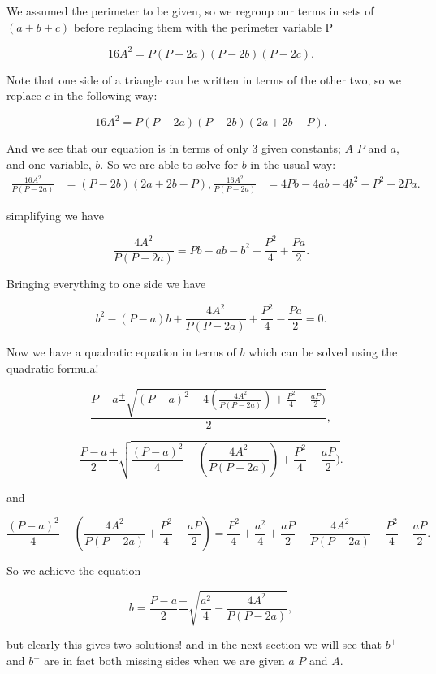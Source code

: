 \documentclass[12pt]{report}
\numberwithin{definition}{section}
\begin{document}
  

	We assumed the perimeter to be given, so we regroup our terms in sets of $(a+b+c)$ before replacing them with the perimeter variable P

\[ 16A^2=P(P-2a)(P-2b)(P-2c). \]

  

Note that one side of a triangle can be written in terms of the other two, so we replace $c$ in the following way: 


  


\[ 16A^2=P(P-2a)(P-2b)(2a+2b-P). \]

And we see that our equation is in terms of only 3 given constants; $A$ $P$ and $a$, and one variable, $b$. 
So  we are able to solve for $b$ in the usual way: 
\begin{align*}
     \frac{16A^2}{P(P-2a)}&=(P-2b)(2a+2b-P),
 \frac{16A^2}{P(P-2a)} &= 4Pb-4ab-4b^2-P^2+2Pa.

\end{align*}

simplifying we have 

\[ \frac{4A^2}{P(P-2a)} = Pb-ab-b^2-\frac{P^2}{4}+\frac{Pa}{2}.\]

Bringing everything to one side we have 

\[b^2-(P-a)b+ \frac{4A^2}{P(P-2a)}+\frac{P^2}{4}-\frac{Pa}{2}=0.\]

Now we have a quadratic equation in terms of $b$ which can be solved using the quadratic formula! 

\[ \frac{P-a\frac{+}{} \sqrt{(P-a)^2-4(\frac{4A^2}{P(P-2a)})+\frac{P^2}{4}-\frac{aP}{2})}}{2},\]

\[ \frac{P-a}{2}\frac{+}{}\sqrt{\frac{(P-a)^2}{4}-(\frac{4A^2}{P(P-2a)})+\frac{P^2}{4}-\frac{aP}{2})}.\]

  


and 

  


\[     \frac{(P-a)^2}{4}-(\frac{4A^2}{P(P-2a)}+\frac{P^2}{4}-\frac{aP}{2}) = 
\frac{P^2}{4}+\frac{a^2}{4}+\frac{aP}{2}- \frac{4A^2}{P(P-2a)}- \frac{P^2}{4}-\frac{aP}{2} .   \]

  


So we achieve the equation 


  


\[b=  \frac{P-a}{2}\frac{+}{}\sqrt{\frac{a^2}{4}-\frac{4A^2}{P(P-2a)}},\]

but clearly this gives two solutions! and in the next section we will see that $b^+$ and $b^-$ are in fact both missing sides when we are given $a$ $P$ and $A$.
\end{document}
